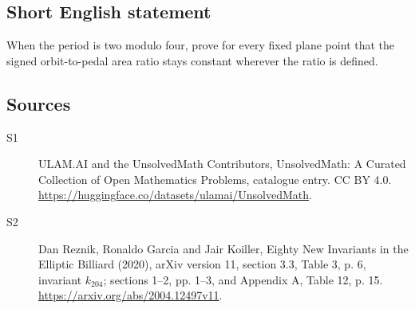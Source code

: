 \documentclass[11pt]{article}
\begin{document}
\subsection{Short English statement}
When the period is two modulo four, prove for every fixed plane point that the signed orbit-to-pedal area ratio stays constant wherever the ratio is defined.
\subsection{Sources}
\begin{description}
\item[\hypertarget{source:statement:1}{S1}] ULAM.AI and the UnsolvedMath Contributors, UnsolvedMath: A Curated Collection of Open Mathematics Problems, catalogue entry. CC BY 4.0. \url{https://huggingface.co/datasets/ulamai/UnsolvedMath}.
\item[\hypertarget{source:statement:2}{S2}] Dan Reznik, Ronaldo Garcia and Jair Koiller, Eighty New Invariants in the Elliptic Billiard (2020), arXiv version 11, section 3.3, Table 3, p. 6, invariant $k_{204}$; sections 1--2, pp. 1--3, and Appendix A, Table 12, p. 15. \url{https://arxiv.org/abs/2004.12497v11}.
\end{description}
\label{end:statement}
\end{document}
